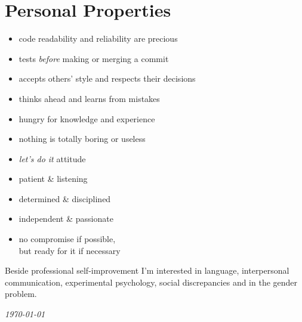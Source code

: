 \documentclass[a4paper,12pt]{article}
\newcommand\Yell{\textbf}
\newcommand\Label{\textsf}
\newcommand{\compress}{\setlength\itemsep{-\parskip}}
\newcommand{\midline}{\rule[0.5ex]{\linewidth-\parindent}{.5pt}}
\newenvironment{compressedItemize}{\begin{itemize}\compress}{\end{itemize}}
\begin{document}
%

\section{Personal Properties}

\begin{multicols}{2}
\begin{compressedItemize}
\item	code readability and reliability are precious
\item	tests \textit{before} making or merging a commit
\item	accepts others' style and respects their decisions
\item	thinks ahead and learns from mistakes
\item	hungry for knowledge and experience
\item	nothing is totally boring or useless
\columnbreak
\item	\textit{let's do it} attitude
\item	patient \& listening
\item	determined \& disciplined
\item	independent \& passionate
\item	no compromise if possible, \\ but ready for it if necessary
\end{compressedItemize}
\end{multicols}

\medskip

Beside professional self-improvement I'm interested in language, interpersonal
communication, experimental psychology, social discrepancies and in the gender
problem.

\center\itshape\today
\end{document}
